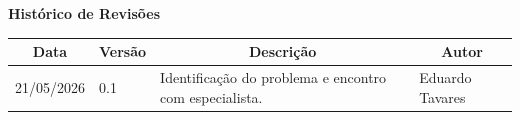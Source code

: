 \begin{table}[h]
	\centering
	\textbf{\Huge{Histórico de Revisões}}
	\begin{tabular}{|p{3cm}|p{1.5cm}|p{7.5cm}|p{3.2cm}|}
		\hline \multicolumn{1}{|c|}{\textbf{Data}} & \multicolumn{1}{|c|}{\textbf{Versão}} &
			\multicolumn{1}{|c|}{\textbf{Descrição}} & \multicolumn{1}{|c|}{\textbf{Autor}} \\ \hline
		21/05/2026 & 0.1 & Identificação do problema e encontro com especialista. & Eduardo Tavares \\ \hline
	\end{tabular}
\end{table}